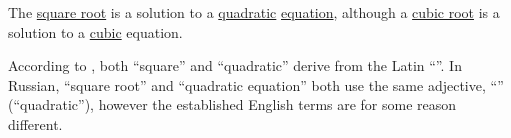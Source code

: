 \begin{remark}\label{rem:square_and_quadratic}
  The \hyperref[def:semigroup_power]{square root} is a solution to a \hyperref[tab:def:polynomial_degree]{quadratic} \hyperref[def:polynomial_equation]{equation}, although a \hyperref[def:semigroup_power]{cubic root} is a solution to a \hyperref[tab:def:polynomial_degree]{cubic} equation.

  According to \textcite[8]{ConwayGuy1998BookOfNumbers}, both \enquote{square} and \enquote{quadratic} derive from the Latin \enquote{}. In Russian, \enquote{square root} and \enquote{quadratic equation} both use the same adjective, \enquote{} (\enquote{quadratic}), however the established English terms are for some reason different.
\end{remark}

